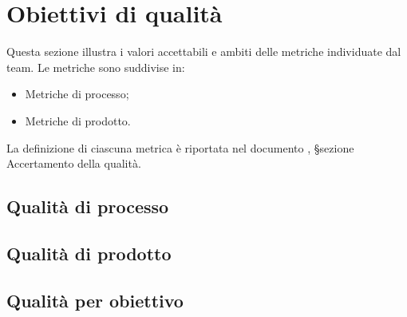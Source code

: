 \section{Obiettivi di qualità}

\par Questa sezione illustra i valori accettabili e ambiti delle metriche individuate dal team. Le metriche sono suddivise in:
\begin{itemize}
  \item Metriche di processo;
  \item Metriche di prodotto.
\end{itemize}

\par La definizione di ciascuna metrica è riportata nel documento \NormeDiProgetto, §sezione Accertamento della qualità.

\subsection{Qualità di processo}


\subsection{Qualità di prodotto}


\subsection{Qualità per obiettivo}
